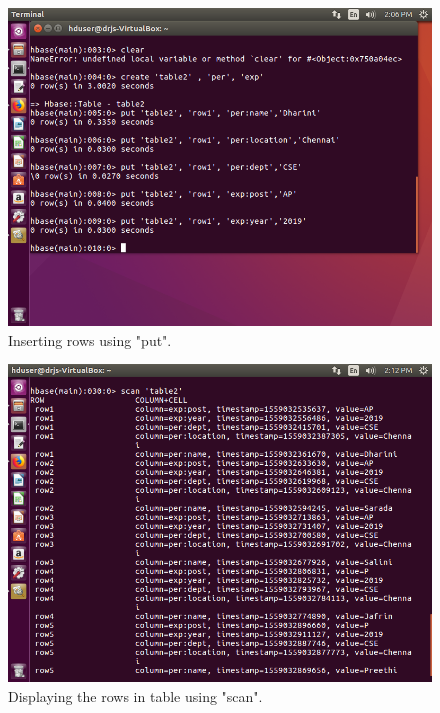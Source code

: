 \documentclass[a4paper,10pt]{article}
\begin{document}
\begin{figure}[h]
	\includegraphics[scale=0.33,center]{13.png}
	\caption{Inserting rows using "put".}
	\label{fig:15}
\end{figure}

\begin{figure}[h]
	\includegraphics[scale=0.33,center]{17.png}
	\caption{Displaying the rows in table using "scan".}
	\label{fig:16}
\end{figure}
\end{document}
